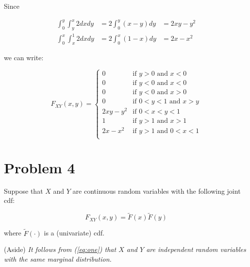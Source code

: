 \documentclass{article}
\newcommand{\1}{\mathbf{1}}
\begin{document}
\begin{enumerate}
    Since
    
    \begin{align*}
         \int_0^y \int_y^x 2dxdy &= 2\int_0^y(x-y)dy &= 2xy -y^2 \\
         \int_0^x \int_x^1 2dxdy &= 2\int_0^x(1-x)dy &= 2x - x^2
    \end{align*}
    
    we can write:
    
    $$
    F_{XY}(x,y) = \begin{cases} 
	        0        &\mbox{if } y > 0     \mbox{ and } x < 0 \\
	        0        &\mbox{if } y < 0     \mbox{ and } x < 0 \\
	        0        &\mbox{if } y < 0     \mbox{ and } x > 0 \\
	        0        &\mbox{if } 0 < y < 1 \mbox{ and } x > y \\
	        2xy-y^2  &\mbox{if } 0 < x < y < 1 \\
	        1        &\mbox{if } y > 1     \mbox{ and } x > 1 \\
	        2x-x^2   &\mbox{if } y > 1     \mbox{ and } 0 < x < 1 \\
        \end{cases}
    $$

\end{enumerate}




\newpage
\section*{Problem 4} 
Suppose that $X$ and $Y$ are continuous random variables with the following joint cdf:

\begin{equation}\label{eq:one}
F_{XY}(x,y) = \widetilde{F}(x)\widetilde{F}(y)
\end{equation}

where $\widetilde{F}(\cdot)$ is a (univariate) cdf. 

{{(Aside)} \it It follows from {\rm (\ref{eq:one})} that $X$ and $Y$ are independent random variables with the same
marginal distribution.} 
\end{document}
